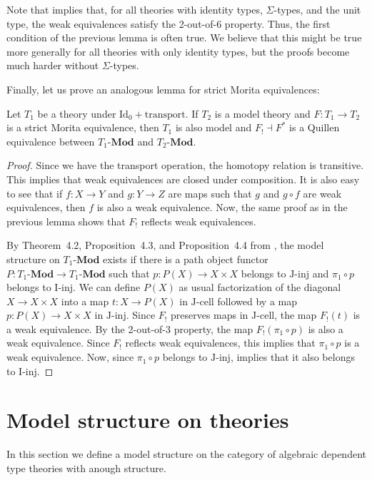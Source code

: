 \documentclass[reqno]{amsart}
\theoremstyle{definition}
\theoremstyle{remark}
\newcommand{\cat}[1]{\mathbf{#1}}
\newcommand{\Mod}[1]{#1\text{-}\cat{Mod}}
\newcommand{\IdT}{\mathrm{Id}}
\newcommand{\transportT}{\mathrm{transport}}
\newcommand{\I}{\mathrm{I}}
\newcommand{\J}{\mathrm{J}}
\newcommand{\class}[2]{#1\text{-}\mathrm{#2}}
\newcommand{\Iinj}[1][\I]{\class{#1}{inj}}
\newcommand{\Icell}[1][\I]{\class{#1}{cell}}
\newcommand{\Jinj}[1][]{\Iinj[\J#1]}
\newcommand{\Jcell}[1][]{\Icell[\J#1]}
\numberwithin{figure}{section}
\begin{document}
Note that \cite[Proposition~3.3]{kap-lum-model} implies that, for all theories with identity types, $\Sigma$-types, and the unit type, the weak equivalences satisfy the 2-out-of-6 property.
Thus, the first condition of the previous lemma is often true.
We believe that this might be true more generally for all theories with only identity types, but the proofs become much harder without $\Sigma$-types.

Finally, let us prove an analogous lemma for strict Morita equivalences:

\begin{lem}
Let $T_1$ be a theory under $\IdT_0 + \transportT$.
If $T_2$ is a model theory and $F : T_1 \to T_2$ is a strict Morita equivalence, then $T_1$ is also model and $F_! \dashv F^*$ is a Quillen equivalence between $\Mod{T_1}$ and $\Mod{T_2}$.
\end{lem}
\begin{proof}
Since we have the transport operation, the homotopy relation is transitive.
This implies that weak equivalences are closed under composition.
It is also easy to see that if $f : X \to Y$ and $g : Y \to Z$ are maps such that $g$ and $g \circ f$ are weak equivalences, then $f$ is also a weak equivalence.
Now, the same proof as in the previous lemma shows that $F_!$ reflects weak equivalences.

By Theorem~4.2, Proposition~4.3, and Proposition~4.4 from \cite{f-model-structures}, the model structure on $\Mod{T_1}$ exists if there is a path object functor $P : \Mod{T_1} \to \Mod{T_1}$
such that $p : P(X) \to X \times X$ belongs to $\Jinj$ and $\pi_1 \circ p$ belongs to $\Iinj$.
We can define $P(X)$ as usual factorization of the diagonal $X \to X \times X$ into a map $t : X \to P(X)$ in $\Jcell$ followed by a map $p : P(X) \to X \times X$ in $\Jinj$.
Since $F_!$ preserves maps in $\Jcell$, the map $F_!(t)$ is a weak equivalence.
By the 2-out-of-3 property, the map $F_!(\pi_1 \circ p)$ is also a weak equivalence.
Since $F_!$ reflects weak equivalences, this implies that $\pi_1 \circ p$ is a weak equivalence.
Now, since $\pi_1 \circ p$ belongs to $\Jinj$, \cite[Proposition~3.1]{f-model-structures} implies that it also belongs to $\Iinj$.
\end{proof}

\section{Model structure on theories}

In this section we define a model structure on the category of algebraic dependent type theories with anough structure.
\end{document}

